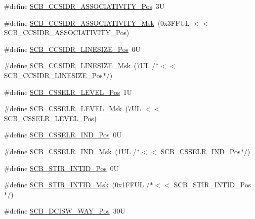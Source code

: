 \begin{DoxyCompactItemize}
\item 
\#define \mbox{\hyperlink{group__CMSIS__SCB_gae67f2f83976b819fb3039fc35cfef0fb}{S\+C\+B\+\_\+\+C\+C\+S\+I\+D\+R\+\_\+\+A\+S\+S\+O\+C\+I\+A\+T\+I\+V\+I\+T\+Y\+\_\+\+Pos}}~3U
\item 
\#define \mbox{\hyperlink{group__CMSIS__SCB_gae093c4c635dad43845967512fa87173a}{S\+C\+B\+\_\+\+C\+C\+S\+I\+D\+R\+\_\+\+A\+S\+S\+O\+C\+I\+A\+T\+I\+V\+I\+T\+Y\+\_\+\+Msk}}~(0x3\+F\+F\+U\+L $<$$<$ S\+C\+B\+\_\+\+C\+C\+S\+I\+D\+R\+\_\+\+A\+S\+S\+O\+C\+I\+A\+T\+I\+V\+I\+T\+Y\+\_\+\+Pos)
\item 
\#define \mbox{\hyperlink{group__CMSIS__SCB_ga750388e1509b36d35568a68a7a1e1ff7}{S\+C\+B\+\_\+\+C\+C\+S\+I\+D\+R\+\_\+\+L\+I\+N\+E\+S\+I\+Z\+E\+\_\+\+Pos}}~0U
\item 
\#define \mbox{\hyperlink{group__CMSIS__SCB_ga07b3bdffe4c289b9c19c70cf698499da}{S\+C\+B\+\_\+\+C\+C\+S\+I\+D\+R\+\_\+\+L\+I\+N\+E\+S\+I\+Z\+E\+\_\+\+Msk}}~(7\+U\+L /$\ast$$<$$<$ S\+C\+B\+\_\+\+C\+C\+S\+I\+D\+R\+\_\+\+L\+I\+N\+E\+S\+I\+Z\+E\+\_\+\+Pos$\ast$/)
\item 
\#define \mbox{\hyperlink{group__CMSIS__SCB_ga8c014c9678bc9072f10459a1e14b973c}{S\+C\+B\+\_\+\+C\+S\+S\+E\+L\+R\+\_\+\+L\+E\+V\+E\+L\+\_\+\+Pos}}~1U
\item 
\#define \mbox{\hyperlink{group__CMSIS__SCB_gaa24e3a6d6960acff3d6949e416046cf0}{S\+C\+B\+\_\+\+C\+S\+S\+E\+L\+R\+\_\+\+L\+E\+V\+E\+L\+\_\+\+Msk}}~(7\+U\+L $<$$<$ S\+C\+B\+\_\+\+C\+S\+S\+E\+L\+R\+\_\+\+L\+E\+V\+E\+L\+\_\+\+Pos)
\item 
\#define \mbox{\hyperlink{group__CMSIS__SCB_ga70e80783c3bd7b11504c63b052b0c0b9}{S\+C\+B\+\_\+\+C\+S\+S\+E\+L\+R\+\_\+\+I\+N\+D\+\_\+\+Pos}}~0U
\item 
\#define \mbox{\hyperlink{group__CMSIS__SCB_ga4e5d98f4d43366cadcc5c3d7ac37228c}{S\+C\+B\+\_\+\+C\+S\+S\+E\+L\+R\+\_\+\+I\+N\+D\+\_\+\+Msk}}~(1\+U\+L /$\ast$$<$$<$ S\+C\+B\+\_\+\+C\+S\+S\+E\+L\+R\+\_\+\+I\+N\+D\+\_\+\+Pos$\ast$/)
\item 
\#define \mbox{\hyperlink{group__CMSIS__SCB_gaeb4a916d84d967c1bab8e88800a28984}{S\+C\+B\+\_\+\+S\+T\+I\+R\+\_\+\+I\+N\+T\+I\+D\+\_\+\+Pos}}~0U
\item 
\#define \mbox{\hyperlink{group__CMSIS__SCB_ga7b67f900eb9c63b04e67f8fa6ddcd8ed}{S\+C\+B\+\_\+\+S\+T\+I\+R\+\_\+\+I\+N\+T\+I\+D\+\_\+\+Msk}}~(0x1\+F\+F\+U\+L /$\ast$$<$$<$ S\+C\+B\+\_\+\+S\+T\+I\+R\+\_\+\+I\+N\+T\+I\+D\+\_\+\+Pos$\ast$/)
\item 
\#define \mbox{\hyperlink{group__CMSIS__SCB_gaa6a2a5e1707c9ef277e67dacd4e247fd}{S\+C\+B\+\_\+\+D\+C\+I\+S\+W\+\_\+\+W\+A\+Y\+\_\+\+Pos}}~30U

\end{DoxyCompactItemize}
